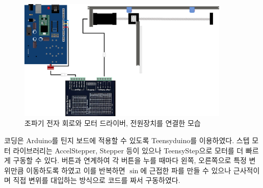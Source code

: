 \begin{figure}[H]
        \includegraphics[width=0.9\textwidth]{images/wavemaker_control.png}
    \caption{조파기 전자 회로와 모터 드라이버, 전원장치를 연결한 모습}
    \label{wavemaker-structure}   
\end{figure}


코딩은 Arduino를 틴지 보드에 적용할 수 있도록 Teensyduino를 이용하였다. 스텝 모터 라이브러리는 AccelStepper, Stepper 등이 있으나 TeensyStep으로 모터를 더 빠르게 구동할 수 있다. 버튼과 연계하여 각 버튼을 누를 때마다 왼쪽, 오른쪽으로 특정 변위만큼 이동하도록 하였고 이를 반복하면 $\sin$에 근접한 파를 만들 수 있으나 근사적이며 직접 변위를 대입하는 방식으로 코드를 짜서 구동하였다.

